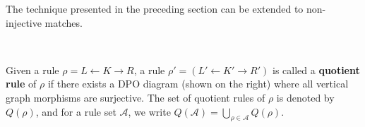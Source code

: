 
The technique presented in the preceding section can be extended to non-injective matches. 

\begin{definition} 
    \ \newline 
    \noindent
    \begin{minipage}{0.7\textwidth}
        Given a rule $\rho \mathop{=} L \mathop{\leftarrow} K \mathop{\rightarrow} R$, a rule $\rho' \mathop{=} (L' \mathop{\leftarrow} K' \mathop{\rightarrow} R')$ is called a \textbf{quotient rule} of $\rho$ if there exists a DPO diagram (shown on the right)
    where all vertical graph morphisms are surjective. The set of quotient rules of $\rho$ is denoted by $Q(\rho)$, and 
    for a rule set $\mathcal{A}$, we write $Q(\mathcal{A}) \mathop{=} \bigcup_{\rho\in\mathcal{A}} Q(\rho)$.
    \end{minipage}
    \hfill
    \begin{minipage}{0.29\textwidth}
        \hfill
    \end{minipage}
\end{definition}

